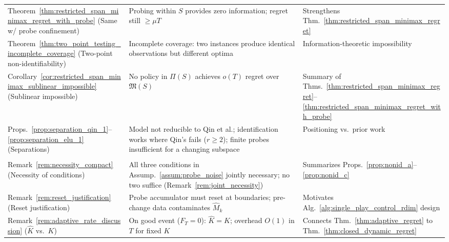 \documentclass{article}
\begin{document}
{\begin{longtable}{
  >{\raggedright\arraybackslash}p{}
  >{\raggedright\arraybackslash}p{}
  >{\raggedright\arraybackslash}p{}
}
Theorem~\ref{thm:restricted_span_minimax_regret_with_probe} \newline (Same w/ probe confinement) &
  Probing within $S$ provides zero information; regret still $\ge\mu T$ &
  Strengthens Thm.~\ref{thm:restricted_span_minimax_regret} \\

Theorem~\ref{thm:two_point_testing_incomplete_coverage} \newline (Two-point non-identifiability) &
  Incomplete coverage: two instances produce identical observations but different optima &
  Information-theoretic impossibility \\

Corollary~\ref{cor:restricted_span_minimax_sublinear_impossible} \newline (Sublinear impossible) &
  No policy in $\Pi(S)$ achieves $o(T)$ regret over $\mathfrak M(S)$ &
  Summary of Thms.~\ref{thm:restricted_span_minimax_regret}--\ref{thm:restricted_span_minimax_regret_with_probe} \\

Props.~\ref{prop:separation_qin_1}--\ref{prop:separation_elu_1} \newline (Separations) &
  Model not reducible to Qin et al.; identification works where Qin's fails ($r\!\ge\!2$); finite probes insufficient for a changing subspace &
  Positioning vs.\ prior work \\

\midrule
\multicolumn{3}{l}{\textit{\textbf{Key remarks} --- interpretive context}} \\
\midrule

Remark~\ref{rem:necessity_compact} \newline (Necessity of conditions) &
  All three conditions in Assump.~\ref{assum:probe_noise} jointly necessary; no two suffice (Remark~\ref{rem:joint_necessity}) &
  Summarizes Props.~\ref{prop:nonid_a}--\ref{prop:nonid_c} \\

Remark~\ref{rem:reset_justification} \newline (Reset justification) &
  Probe accumulator must reset at boundaries; pre-change data contaminates $\widehat M_k$ &
  Motivates Alg.~\ref{alg:single_play_control_rdim} design \\

Remark~\ref{rem:adaptive_rate_discussion} \newline ($\hat K$ vs.\ $K$) &
  On good event ($F_T\!=\!0$): $\hat K\!=\!K$; overhead $O(1)$ in $T$ for fixed $K$ &
  Connects Thm.~\ref{thm:adaptive_regret} to Thm.~\ref{thm:closed_dynamic_regret} \\


\end{longtable}}
\end{document}
